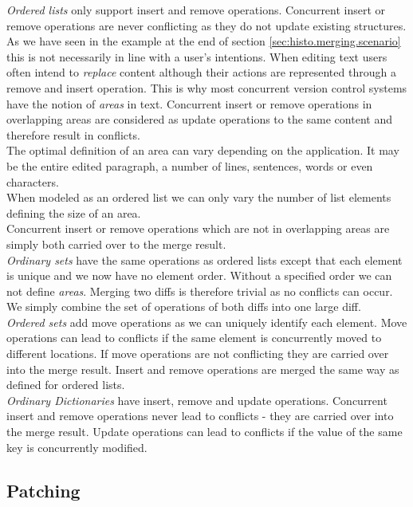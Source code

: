 \emph{Ordered lists} only support insert and remove operations.
Concurrent insert or remove operations are never conflicting as they do not update existing structures.
As we have seen in the example at the end of section \ref{sec:histo.merging.scenario} this is not necessarily in line with a user's intentions.
When editing text users often intend to \emph{replace} content although their actions are represented through a remove and insert operation.
This is why most concurrent version control systems have the notion of \emph{areas} in text.
Concurrent insert or remove operations in overlapping areas are considered as update operations to the same content and therefore result in conflicts.\\
The optimal definition of an area can vary depending on the application.
It may be the entire edited paragraph, a number of lines, sentences, words or even characters.\\
When modeled as an ordered list we can only vary the number of list elements defining the size of an area.\\
Concurrent insert or remove operations which are not in overlapping areas are simply both carried over to the merge result.\\

\emph{Ordinary sets} have the same operations as ordered lists except that each element is unique and we now have no element order.
Without a specified order we can not define \emph{areas}.
Merging two diffs is therefore trivial as no conflicts can occur.
We simply combine the set of operations of both diffs into one large diff.\\

\emph{Ordered sets} add move operations as we can uniquely identify each element.
Move operations can lead to conflicts if the same element is concurrently moved to different locations.
If move operations are not conflicting they are carried over into the merge result.
Insert and remove operations are merged the same way as defined for ordered lists.\\

\emph{Ordinary Dictionaries} have insert, remove and update operations.
Concurrent insert and remove operations never lead to conflicts - they are carried over into the merge result.
Update operations can lead to conflicts if the value of the same key is concurrently modified.

\subsection{Patching}
\label{sec:histo.merging.patching}


